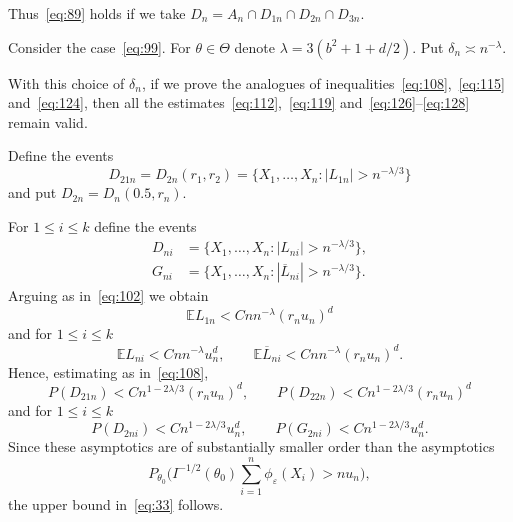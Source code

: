 \documentclass[11pt,a4paper]{article}
\begin{document}
Thus~\eqref{eq:89} holds if we take $D_n=A_n\cap D_{1n}\cap D_{2n}\cap D_{3n}$.

Consider the case~\eqref{eq:99}. For $\theta\in\Theta$ denote $\lambda=3(b^2+1+d/2)$. Put $\delta_n\asymp n^{-\lambda}$.

With this choice of $\delta_n$, if we prove the analogues of inequalities~\eqref{eq:108},~\eqref{eq:115} and~\eqref{eq:124}, then all the estimates~\eqref{eq:112},~\eqref{eq:119} and~\eqref{eq:126}--\eqref{eq:128} remain valid.

Define the events
\begin{equation}
D_{21n}=D_{2n}(r_1,r_2)=\bigl\{X_1,\dots,X_n:|L_{1n}|>n^{-\lambda/3}\bigr\}
\label{eq:129}
\end{equation}
and put $D_{2n}=D_n(0.5,r_n)$.

For $1\le i\le k$ define the events
\begin{align}
D_{ni}&=\bigl\{X_1,\dots,X_n:|L_{ni}|>n^{-\lambda/3}\bigr\},
\label{eq:130}\\
G_{ni}&=\bigl\{X_1,\dots,X_n:|\overline{L}_{ni}|>n^{-\lambda/3}\bigr\}.
\label{eq:131}
\end{align}
Arguing as in~\eqref{eq:102} we obtain
\begin{equation}
\mathbb{E} L_{1n}<Cnn^{-\lambda}(r_nu_n)^d
\label{eq:132}
\end{equation}
and for $1\le i\le k$
\begin{equation}
\mathbb{E} L_{ni}<Cnn^{-\lambda}u_n^d,\qquad
\mathbb{E}\overline{L}_{ni}<Cnn^{-\lambda}(r_nu_n)^d.
\label{eq:133}
\end{equation}
Hence, estimating as in~\eqref{eq:108},
\begin{equation}
P(D_{21n})<Cn^{1-2\lambda/3}(r_nu_n)^d,\qquad
P(D_{22n})<Cn^{1-2\lambda/3}(r_nu_n)^d
\label{eq:134}
\end{equation}
and for $1\le i\le k$
\begin{equation}
P(D_{2ni})<Cn^{1-2\lambda/3}u_n^d,\qquad
P(G_{2ni})<Cn^{1-2\lambda/3}u_n^d.
\label{eq:135}
\end{equation}
Since these asymptotics are of substantially smaller order than the asymptotics
\begin{equation}
P_{\theta_0}\Biggl(I^{-1/2}(\theta_0)\sum_{i=1}^n\phi_\varepsilon(X_i)>nu_n\Biggr),
\label{eq:136}
\end{equation}
the upper bound in~\eqref{eq:33} follows.
\end{document}
